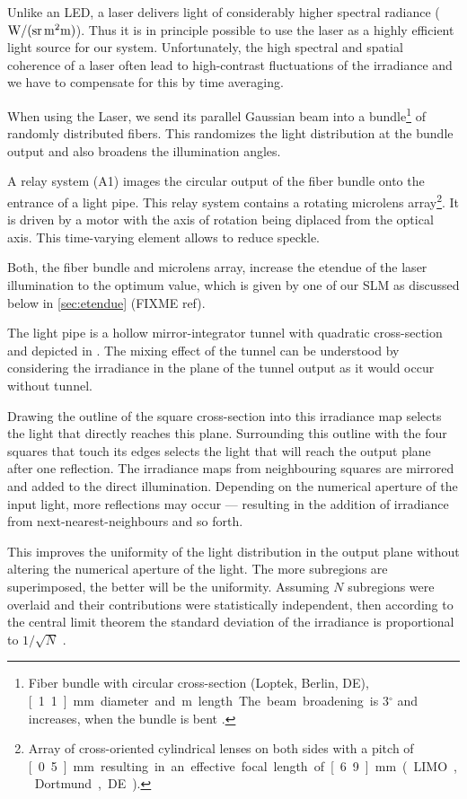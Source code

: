 Unlike an LED, a laser delivers light of considerably higher spectral
radiance ($\unit[]{W/(sr\, m^2 m)}$). Thus it is in principle possible
to use the laser as a highly efficient light source for our
system. Unfortunately, the high spectral and spatial coherence of a
laser often lead to high-contrast fluctuations of the irradiance and
we have to compensate for this by time averaging.

When using the Laser, we send its parallel Gaussian beam into a
bundle\footnote{Fiber bundle with circular cross-section (Loptek,
  Berlin, DE), \unit[1.1]{mm} diameter and \unit[2]{m} length. The
  beam broadening is $3{}^\circ$ and increases, when the bundle is
  bent \citep{D8.4}.}  of randomly distributed fibers. This randomizes
the light distribution at the bundle output and also broadens the
illumination angles.

A relay system (A1) images the circular output of the fiber bundle
onto the entrance of a light pipe. This relay system contains a
rotating microlens array\footnote{Array of cross-oriented cylindrical
  lenses on both sides with a pitch of \unit[0.5]{mm} resulting in an
  effective focal length of \unit[6.9]{mm} (LIMO, Dortmund, DE).}. It
is driven by a motor with the axis of rotation being diplaced from the
optical axis. This time-varying element allows to reduce speckle.

Both, the fiber bundle and microlens array, increase the etendue of
the laser illumination to the optimum value, which is given by one of
our SLM as discussed below in \ref{sec:etendue} (FIXME ref). 

The light  pipe is  a hollow  mirror-integrator tunnel  with quadratic
cross-section and depicted in . The mixing
effect of the  tunnel can be understood by  considering the irradiance
in the plane of the tunnel output as it would occur without tunnel.

Drawing the outline of the square cross-section into this irradiance
map selects the light that directly reaches this plane.  Surrounding
this outline with the four squares that touch its edges selects the
light that will reach the output plane after one reflection. The
irradiance maps from neighbouring squares are mirrored and added to
the direct illumination. Depending on the numerical aperture of the
input light, more reflections may occur --- resulting in the addition
of irradiance from next-nearest-neighbours and so forth.

This improves the uniformity of the light distribution in the output
plane without altering the numerical aperture of the light.  The more
subregions are superimposed, the better will be the uniformity.
Assuming $N$ subregions were overlaid and their contributions were
statistically independent, then according to the central limit theorem
the standard deviation of the irradiance is proportional to
$1/\sqrt{N}$ \citep{Koshel2012}.

